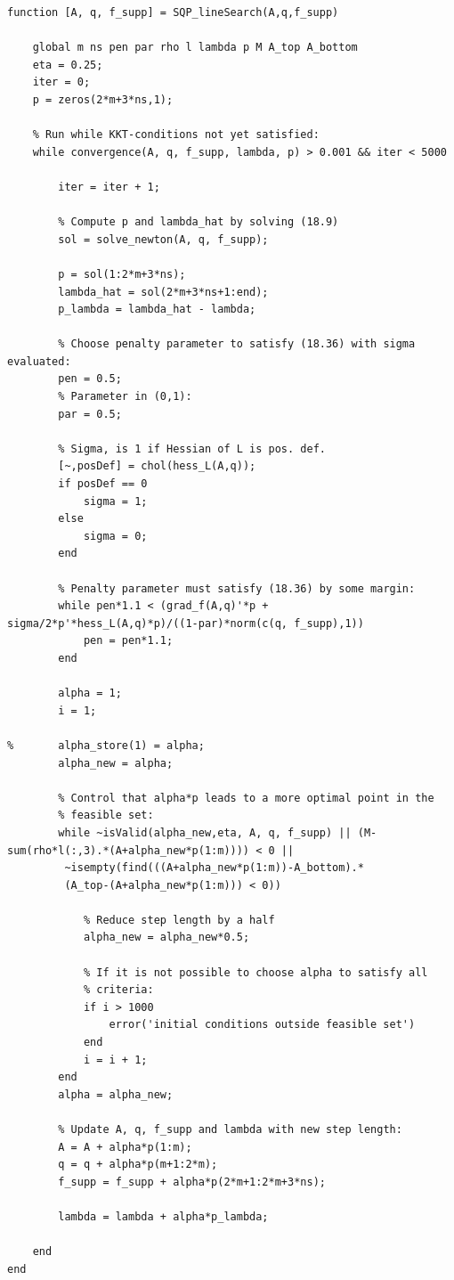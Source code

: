 \begin{lstlisting}
function [A, q, f_supp] = SQP_lineSearch(A,q,f_supp)
  
    global m ns pen par rho l lambda p M A_top A_bottom
    eta = 0.25;
    iter = 0;
    p = zeros(2*m+3*ns,1);

    % Run while KKT-conditions not yet satisfied:
    while convergence(A, q, f_supp, lambda, p) > 0.001 && iter < 5000 
        
        iter = iter + 1;
        
        % Compute p and lambda_hat by solving (18.9)
        sol = solve_newton(A, q, f_supp);
        
        p = sol(1:2*m+3*ns);
        lambda_hat = sol(2*m+3*ns+1:end);
        p_lambda = lambda_hat - lambda;
        
        % Choose penalty parameter to satisfy (18.36) with sigma evaluated:
        pen = 0.5;
        % Parameter in (0,1):
        par = 0.5;

        % Sigma, is 1 if Hessian of L is pos. def.
        [~,posDef] = chol(hess_L(A,q));
        if posDef == 0
            sigma = 1;
        else
            sigma = 0;
        end

        % Penalty parameter must satisfy (18.36) by some margin:
        while pen*1.1 < (grad_f(A,q)'*p + sigma/2*p'*hess_L(A,q)*p)/((1-par)*norm(c(q, f_supp),1))
            pen = pen*1.1;
        end

        alpha = 1;
        i = 1;
            
%       alpha_store(1) = alpha;
        alpha_new = alpha;
        
        % Control that alpha*p leads to a more optimal point in the
        % feasible set:
        while ~isValid(alpha_new,eta, A, q, f_supp) || (M-sum(rho*l(:,3).*(A+alpha_new*p(1:m)))) < 0 || 
         ~isempty(find(((A+alpha_new*p(1:m))-A_bottom).*
         (A_top-(A+alpha_new*p(1:m))) < 0))

            % Reduce step length by a half
            alpha_new = alpha_new*0.5;
            
            % If it is not possible to choose alpha to satisfy all
            % criteria:
            if i > 1000
                error('initial conditions outside feasible set')
            end
            i = i + 1;
        end
        alpha = alpha_new;

        % Update A, q, f_supp and lambda with new step length:
        A = A + alpha*p(1:m);
        q = q + alpha*p(m+1:2*m);
        f_supp = f_supp + alpha*p(2*m+1:2*m+3*ns);

        lambda = lambda + alpha*p_lambda;   
            
    end
end
\end{lstlisting}

